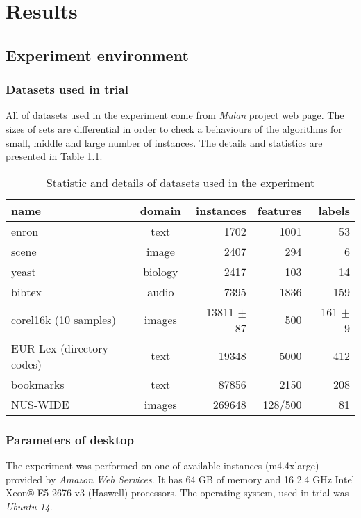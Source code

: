 
\chapter{Results}

\section{Experiment environment}
\subsection{Datasets used in trial}

All of datasets used in the experiment come from \textit{Mulan} project web page. The sizes of sets are differential in order to check a behaviours of the algorithms for small, middle and large number of instances. The details and statistics are presented in Table \ref{tab:exp1}. 

\begin{table}[h]
\centering
\caption{Statistic and details of datasets used in the experiment}
\label{tab:exp1}
    \begin{tabular}{l|c|r|r|r}
    name & domain & instances & features & labels \\ \hline \hline
    enron & text  &  1702  & 1001 &  53 \\
    scene & image &  2407  & 294 & 6 \\   
    yeast & biology & 2417 & 103 & 14 \\
    bibtex & audio & 7395 & 1836 & 159 \\
    corel16k (10 samples) & images & 13811 $\pm$ 87 & 500 & 161 $\pm$ 9\\
    EUR-Lex (directory codes) & text & 19348 & 5000 & 412 \\
    bookmarks & text & 87856 & 2150 & 208 \\
    NUS-WIDE & images &  269648 & 128/500 & 81  
    \end{tabular}
\end{table}

\subsection{Parameters of desktop}

The experiment was performed on one of available instances (m4.4xlarge) provided by \textit{Amazon Web Services}. It has 64 GB of memory and 16 2.4 GHz Intel Xeon® E5-2676 v3 (Haswell) processors. The operating system, used in trial was \textit{Ubuntu 14}.

